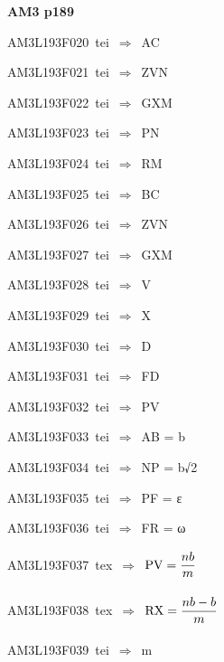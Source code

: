 \par\vfill\eject
{\bf\hfill AM3 p189\hfill\hbox{}}\par\bigskip
{\sixrm AM3L193F020\ {\sixit tei}\ }$\Rightarrow$\ AC\par\smallskip
{\sixrm AM3L193F021\ {\sixit tei}\ }$\Rightarrow$\ ZVN\par\smallskip
{\sixrm AM3L193F022\ {\sixit tei}\ }$\Rightarrow$\ GXM\par\smallskip
{\sixrm AM3L193F023\ {\sixit tei}\ }$\Rightarrow$\ PN\par\smallskip
{\sixrm AM3L193F024\ {\sixit tei}\ }$\Rightarrow$\ RM\par\smallskip
{\sixrm AM3L193F025\ {\sixit tei}\ }$\Rightarrow$\ BC\par\smallskip
{\sixrm AM3L193F026\ {\sixit tei}\ }$\Rightarrow$\ ZVN\par\smallskip
{\sixrm AM3L193F027\ {\sixit tei}\ }$\Rightarrow$\ GXM\par\smallskip
{\sixrm AM3L193F028\ {\sixit tei}\ }$\Rightarrow$\ V\par\smallskip
{\sixrm AM3L193F029\ {\sixit tei}\ }$\Rightarrow$\ X\par\smallskip
{\sixrm AM3L193F030\ {\sixit tei}\ }$\Rightarrow$\ D\par\smallskip
{\sixrm AM3L193F031\ {\sixit tei}\ }$\Rightarrow$\ FD\par\smallskip
{\sixrm AM3L193F032\ {\sixit tei}\ }$\Rightarrow$\ PV\par\smallskip
{\sixrm AM3L193F033\ {\sixit tei}\ }$\Rightarrow$\ AB = {\tenit b}\par\smallskip
{\sixrm AM3L193F034\ {\sixit tei}\ }$\Rightarrow$\ NP = {\tenit b}√2\par\smallskip
{\sixrm AM3L193F035\ {\sixit tei}\ }$\Rightarrow$\ PF =  ε\par\smallskip
{\sixrm AM3L193F036\ {\sixit tei}\ }$\Rightarrow$\ FR =  ω\par\smallskip
{\sixrm AM3L193F037\ {\sixit tex}\ }$\Rightarrow$\ ${\rm PV} = {\displaystyle\strut nb\over \displaystyle\strut m}$\par\smallskip
{\sixrm AM3L193F038\ {\sixit tex}\ }$\Rightarrow$\ ${\rm RX} = {\displaystyle\strut {nb - b}\over \displaystyle\strut m}$\par\smallskip
{\sixrm AM3L193F039\ {\sixit tei}\ }$\Rightarrow$\ {\tenit m}\par\smallskip

